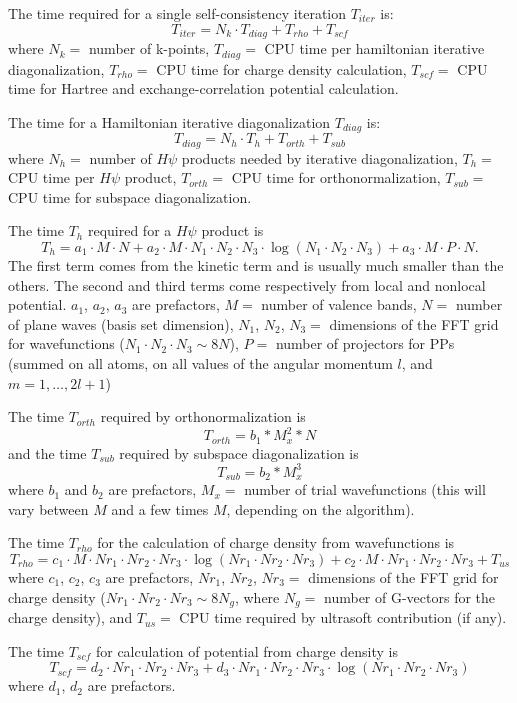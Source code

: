 \documentclass[12pt,a4paper]{article}
\begin{document}
The time required for a single self-consistency iteration
$T_{iter}$ is:
$$
T_{iter} = N_k \cdot T_{diag} + T_{rho} + T_{scf}
$$
where $N_k=$ number of k-points, $T_{diag}=$ CPU time per hamiltonian
iterative diagonalization, $T_{rho}=$ CPU time for charge density
calculation, $T_{scf}=$ CPU time for Hartree and exchange-correlation
potential calculation.

The time for a Hamiltonian iterative diagonalization $T_{diag}$ is:
$$
T_{diag} = N_h \cdot T_h + T_{orth} + T_{sub}
$$
where $N_h=$ number of $H\psi$ products needed by iterative
diagonalization, $T_h=$ CPU time per $H\psi$ product, $T_{orth}=$ CPU
time for orthonormalization, $T_{sub}=$ CPU time for subspace
diagonalization.

The time $T_h$ required for a $H\psi$ product is
$$
T_h = a_1 \cdot M \cdot N
      + a_2 \cdot M \cdot N_1 \cdot N_2 \cdot N_3 \cdot
        \log(N_1 \cdot N_2 \cdot N_3)
      + a_3 \cdot M \cdot P \cdot N.
$$
The first term comes from the kinetic term and is usually much smaller
than the others.
The second and third terms come respectively from local and nonlocal
potential.
$a_1$, $a_2$, $a_3$ are prefactors, $M=$ number of valence bands,
$N=$ number of plane waves (basis set dimension), 
$N_1$, $N_2$, $N_3=$ dimensions of the FFT grid for wavefunctions
($N_1 \cdot N_2 \cdot N_3 \sim 8N$), $P=$ number of projectors for PPs
(summed on all atoms, on all values of the angular momentum $l$, and
$m=1,\dots,2l+1$)

The time $T_{orth}$ required by orthonormalization is
$$
      T_{orth}=b_1*M_x^2*N
$$
and the time $T_{sub}$ required by subspace diagonalization is
$$
   T_{sub}=b_2*M_x^3
$$
where $b_1$ and $b_2$ are prefactors, $M_x=$ number of trial
wavefunctions (this will vary between $M$ and a few times $M$,
depending on the algorithm).

The time $T_{rho}$ for the calculation of charge density from
wavefunctions is
$$
T_{rho} = c_1 \cdot M \cdot Nr_1 \cdot Nr_2 \cdot Nr_3 \cdot
          \log(Nr_1 \cdot Nr_2 \cdot Nr_3)
          + c_2 \cdot M \cdot Nr_1 \cdot Nr_2 \cdot Nr_3 + T_{us}
$$
where $c_1$, $c_2$, $c_3$ are prefactors,
$Nr_1$, $Nr_2$, $Nr_3=$ dimensions of the FFT grid for charge density
($Nr_1 \cdot Nr_2 \cdot Nr_3 \sim 8N_g$, where $N_g=$ number of
G-vectors for the charge density), and $T_{us}=$ CPU time required by
ultrasoft contribution (if any).

The time $T_{scf}$ for calculation of potential from charge density is
$$
T_{scf} = d_2 \cdot Nr_1 \cdot Nr_2 \cdot Nr_3 + d_3 \cdot
          Nr_1 \cdot Nr_2 \cdot Nr_3 \cdot
          \log(Nr_1 \cdot Nr_2 \cdot Nr_3) 
$$
where $d_1$, $d_2$ are prefactors.
\end{document}
